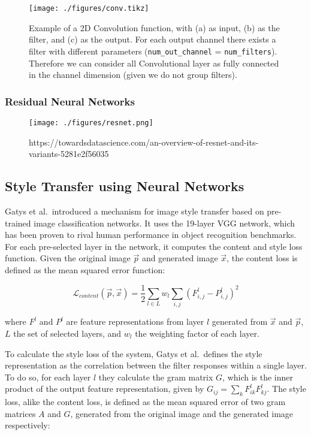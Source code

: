 \documentclass[]{article}
\begin{document}
\begin{figure}[h]
    \texttt{[image: ./figures/conv.tikz]}
    \centering
    \caption{Example of a 2D Convolution function, with (a) as input, (b) as the filter, and (c) as the output. For each output channel there exists a filter with different parameters (\texttt{num\_out\_channel} = \texttt{num\_filters}). Therefore we can consider all Convolutional layer as fully connected in the channel dimension (given we do not group filters).}
\end{figure}

\hypertarget{residual-neural-networks}{%
\subsubsection{Residual Neural
Networks}\label{residual-neural-networks}}

\begin{figure}[h]
    \texttt{[image: ./figures/resnet.png]}
    \centering
    \caption{https://towardsdatascience.com/an-overview-of-resnet-and-its-variants-5281e2f56035}
\end{figure}

\hypertarget{style-transfer-using-neural-networks}{%
\subsection{Style Transfer using Neural
Networks}\label{style-transfer-using-neural-networks}}

Gatys et al.~introduced a mechanism for image style transfer based on
pre-trained image classification networks. It uses the 19-layer VGG
network, which has been proven to rival human performance in object
recognition benchmarks. For each pre-selected layer in the network, it
computes the content and style loss function. Given the original image
\(\vec{p}\) and generated image \(\vec{x}\), the content loss is defined
as the mean squared error function:

\begin{equation}
    \mathcal{L}_{content}(\vec{p}, \vec{x}) = \frac{1}{2} \sum_{l \in L} w_l \sum_{i,j} (F^l_{i, j} - P^l_{i, j})^2
\end{equation}

where \(F^l\) and \(P^l\) are feature representations from layer \(l\)
generated from \(\vec{x}\) and \(\vec{p}\), \(L\) the set of selected
layers, and \(w_l\) the weighting factor of each layer.

To calculate the style loss of the system, Gatys et al.~defines the
style representation as the correlation between the filter responses
within a single layer. To do so, for each layer \(l\) they calculate the
gram matrix \(G\), which is the inner product of the output feature
representation, given by \(G_{ij} = \sum_{k} F^l_{ik} F^l_{kj}\). The
style loss, alike the content loss, is defined as the mean squared error
of two gram matrices \(A\) and \(G\), generated from the original image
and the generated image respectively:
\end{document}
